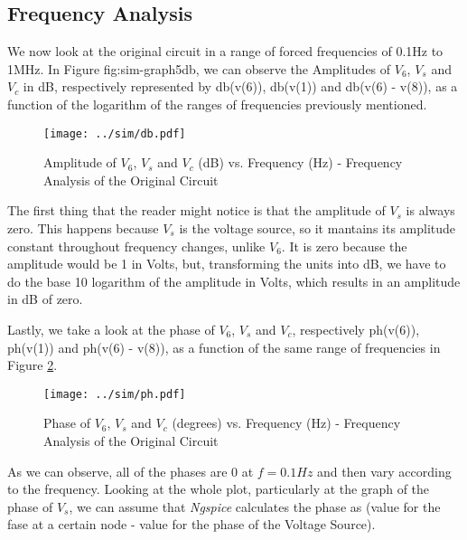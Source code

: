 \subsection{Frequency Analysis}

We now look at the original circuit in a range of forced frequencies of 0.1Hz to 1MHz. In Figure {fig:sim-graph5db}, we can observe the Amplitudes of $V_6$, $V_s$ and $V_c$ in dB, respectively represented by db(v(6)), db(v(1)) and db(v(6) - v(8)), as a function of the logarithm of the ranges of frequencies previously mentioned.


\begin{figure}[h] \centering
\texttt{[image: ../sim/db.pdf]}
\caption{Amplitude of $V_6$, $V_s$ and $V_c$ (dB) vs. Frequency (Hz) - Frequency Analysis of the Original Circuit}
\label{fig:sim-graph5db}
\end{figure}

The first thing that the reader might notice is that the amplitude of $V_s$ is always zero. This happens because $V_s$ is the voltage source, so it mantains its amplitude constant throughout frequency changes, unlike $V_6$. It is zero because the amplitude would be 1 in Volts, but, transforming the units into dB, we have to do the base 10 logarithm of the amplitude in Volts, which results in an amplitude in dB of zero.

Lastly, we take a look at the phase of $V_6$, $V_s$ and $V_c$, respectively ph(v(6)), ph(v(1)) and ph(v(6) - v(8)), as a function of the same range of frequencies in Figure \ref{fig:sim-graph5ph}.

\begin{figure}[h] \centering
\texttt{[image: ../sim/ph.pdf]}
\caption{Phase of $V_6$, $V_s$ and $V_c$ (degrees) vs. Frequency (Hz) - Frequency Analysis of the Original Circuit}
\label{fig:sim-graph5ph}
\end{figure}


As we can observe, all of the phases are 0 at $f=0.1Hz$ and then vary according to the frequency. Looking at the whole plot, particularly at the graph of the phase of $V_s$, we can assume that \textit{Ngspice} calculates the phase as (value for the fase at a certain node - value for the phase of the Voltage Source).